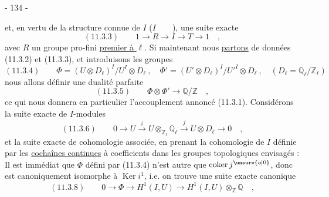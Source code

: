\begin{center}- 134 -\end{center}

et, en vertu de la structure connue de $I$ ($I\qquad$), une suite exacte
\[
(11.3.3)\qquad 1\longrightarrow R\longrightarrow I\longrightarrow T\longrightarrow 1\quad,
\]
avec $R$ un groupe pro-fini \uline{premier à $\ell$}. Si maintenant nous \uline{partons} de données (11.3.2) et (11.3.3), et introduisons les groupes
\[
(11.3.4)\qquad \Phi=(U\otimes D_\ell)^I/U^I\otimes D_\ell\ ,\quad
\Phi'=(U'\otimes D_\ell)^I/U'^I\otimes D_\ell\ ,\quad
(D_\ell=\mathbb{Q}_\ell/\mathbb{Z}_\ell)
\]
nous allons définir une dualité parfaite
\[
(11.3.5)\qquad \Phi\otimes\Phi'\longrightarrow\mathbb{Q}/\mathbb{Z}\quad,
\]
ce qui nous donnera en particulier l'accouplement annoncé (11.3.1).
Considérons la suite exacte de $I$-modules
\[
(11.3.6)\qquad 0\longrightarrow U\xrightarrow{i}U\otimes_{\mathbb{Z}_\ell}\mathbb{Q}_\ell
\xrightarrow{j}U\otimes D_\ell\longrightarrow 0\quad,
\]
et la suite exacte de cohomologie associée, en prenant la cohomologie de $I$ définie par les \uline{cochaînes continues} à coefficients dans les groupes topologiques envisagés :
Il est immédiat que $\Phi$ défini par (11.3.4) n'est autre que $\operatorname{coker}j^{\unsure{o|0}}$, donc est canoniquement isomorphe à $\operatorname{Ker}i^1$, i.e. on trouve une suite exacte canonique
\[
(11.3.8)\qquad 0\longrightarrow\Phi\longrightarrow H^1(I,U)\longrightarrow H^1(I,U)\otimes_{\mathbb{Z}}\mathbb{Q}\quad,
\]

